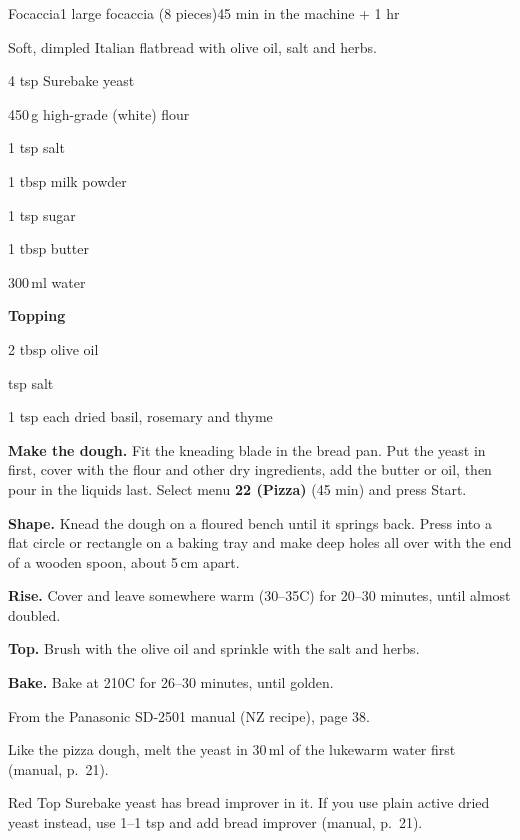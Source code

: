 \begin{recipebox}{Focaccia}{1 large focaccia (8 pieces)}{45 min in the machine + 1 hr}

Soft, dimpled Italian flatbread with olive oil, salt and herbs.

\begin{ingredients}
  \item 4 tsp Surebake yeast
  \item 450\,g high-grade (white) flour
  \item 1 tsp salt
  \item 1 tbsp milk powder
  \item 1 tsp sugar
  \item 1 tbsp butter
  \item 300\,ml water
  \item[] \textbf{Topping}
  \item 2 tbsp olive oil
  \item {} tsp salt
  \item 1 tsp each dried basil, rosemary and thyme
\end{ingredients}

\begin{method}
  \item \textbf{Make the dough.} Fit the kneading blade in the bread pan. Put the yeast in first, cover with the flour and other dry ingredients, add the butter or oil, then pour in the liquids last. Select menu \textbf{22 (Pizza)} (45 min) and press Start.
  \item \textbf{Shape.} Knead the dough on a floured bench until it springs back. Press into a flat circle or rectangle on a baking tray and make deep holes all over with the end of a wooden spoon, about 5\,cm apart.
  \item \textbf{Rise.} Cover and leave somewhere warm (30--35\degree C) for 20--30 minutes, until almost doubled.
  \item \textbf{Top.} Brush with the olive oil and sprinkle with the salt and herbs.
  \item \textbf{Bake.} Bake at 210\degree C for 26--30 minutes, until golden.
\end{method}

\begin{notelist}
  \item From the Panasonic SD-2501 manual (NZ recipe), page 38.
  \item Like the pizza dough, melt the yeast in 30\,ml of the lukewarm water first (manual, p.~21).
  \item Red Top Surebake yeast has bread improver in it. If you use plain active dried yeast instead, use 1--1 tsp and add bread improver (manual, p.~21).
\end{notelist}

\end{recipebox}
